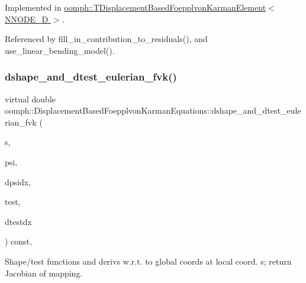 Implemented in \hyperlink{classoomph_1_1TDisplacementBasedFoepplvonKarmanElement_ad690f5dcab636d760f70779bdb60bd4e}{oomph\+::\+T\+Displacement\+Based\+Foepplvon\+Karman\+Element$<$ N\+N\+O\+D\+E\+\_\+D $>$}.



Referenced by fill\+\_\+in\+\_\+contribution\+\_\+to\+\_\+residuals(), and use\+\_\+linear\+\_\+bending\+\_\+model().

\mbox{\label{classoomph_1_1DisplacementBasedFoepplvonKarmanEquations_a91d0e65a45461295c271b6f2e9604f67}} 
\subsubsection{\texorpdfstring{dshape\+\_\+and\+\_\+dtest\+\_\+eulerian\+\_\+fvk()}{dshape\_and\_dtest\_eulerian\_fvk()}}
{\footnotesize\ttfamily virtual double oomph\+::\+Displacement\+Based\+Foepplvon\+Karman\+Equations\+::dshape\+\_\+and\+\_\+dtest\+\_\+eulerian\+\_\+fvk (\begin{DoxyParamCaption}\item[{const \hyperlink{classoomph_1_1Vector}{Vector}$<$ double $>$ \&}]{s,  }\item[{\hyperlink{classoomph_1_1Shape}{Shape} \&}]{psi,  }\item[{\hyperlink{classoomph_1_1DShape}{D\+Shape} \&}]{dpsidx,  }\item[{\hyperlink{classoomph_1_1Shape}{Shape} \&}]{test,  }\item[{\hyperlink{classoomph_1_1DShape}{D\+Shape} \&}]{dtestdx }\end{DoxyParamCaption}) const\hspace{0.3cm}{\ttfamily [protected]}, {}}



Shape/test functions and derivs w.\+r.\+t. to global coords at local coord. s; return Jacobian of mapping. 



